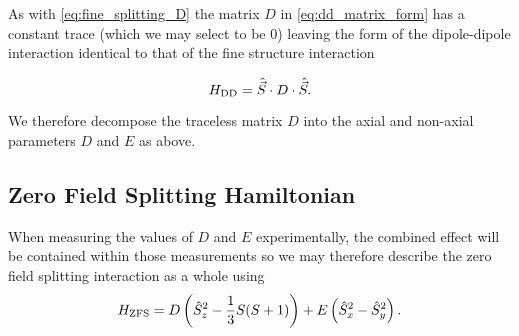 As with \ref{eq:fine_splitting_D} the matrix $D$ in \ref{eq:dd_matrix_form} has a constant trace (which we may select to be $0$) leaving the form of the dipole-dipole interaction identical to that of the fine structure interaction 

\begin{equation}
    H_{\ce{DD}} = \hat{\vec{S}} \cdot D \cdot \hat{\vec{S}}.
\end{equation}

We therefore decompose the traceless matrix $D$ into the axial and non-axial parameters $D$ and $E$ as above. 


\subsection{Zero Field Splitting Hamiltonian}
When measuring the values of $D$ and $E$ experimentally, the combined effect will be contained within those measurements so we may therefore describe the zero field splitting interaction as a whole using 
\begin{equation}
    H_{\ce{ZFS}} =D \left(\hat{S}_z^2 - \frac{1}{3}S(S+1)\right) + E\left(\hat{S}_x^2 - \hat{S}_y^2\right).
    \label{eq:ZFS_hamiltonian}
\end{equation}

